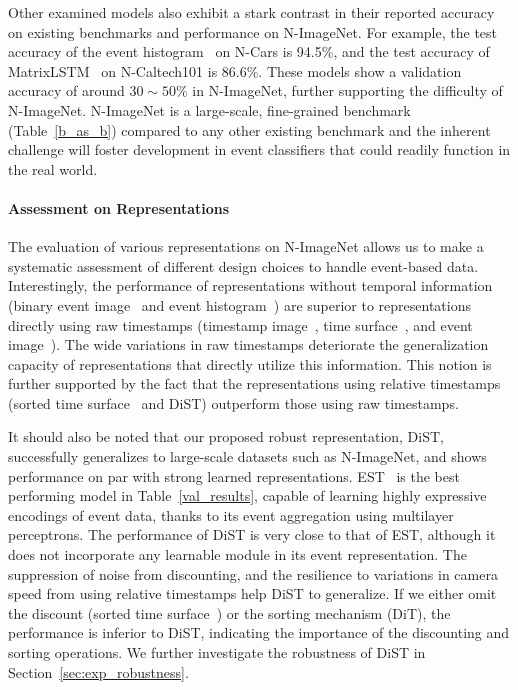 Other examined models also exhibit a stark contrast in their reported accuracy on existing benchmarks and performance on N-ImageNet.
For example, the test accuracy of the event histogram~\cite{asynet} on N-Cars is 94.5\%, and the test accuracy of MatrixLSTM~\cite{matrix_lstm} on N-Caltech101 is 86.6\%.
These models show a validation accuracy of around $30\sim50\%$ in N-ImageNet, further supporting the difficulty of N-ImageNet.
N-ImageNet is a large-scale, fine-grained benchmark (Table~\ref{b_as_b}) compared to any other existing benchmark and the inherent challenge will foster development in event classifiers that could readily function in the real world.

\paragraph{Assessment on Representations}
The evaluation of various representations on N-ImageNet allows us to make a systematic assessment of different design choices to handle event-based data.
Interestingly, the performance of representations without temporal information (binary event image~\cite{gesture_1,binary_image_2} and event histogram~\cite{event_driving}) are superior to representations directly using raw timestamps (timestamp image~\cite{timestamp_image}, time surface~\cite{hots}, and event image~\cite{ev_gait,evflownet}).
The wide variations in raw timestamps deteriorate the generalization capacity of representations that directly utilize this information.
This notion is further supported by the fact that the representations using relative timestamps (sorted time surface~\cite{ace} and DiST) outperform those using raw timestamps.

It should also be noted that our proposed robust representation, DiST, successfully generalizes to large-scale datasets such as N-ImageNet, and shows performance on par with strong learned representations.
EST~\cite{est} is the best performing model in Table~\ref{val_results}, capable of learning highly expressive encodings of event data, thanks to its event aggregation using multilayer perceptrons.
The performance of DiST is very close to that of EST, although it does not incorporate any learnable module in its event representation.
The suppression of noise from discounting, and the resilience to variations in camera speed from using relative timestamps help DiST to generalize.
If we either omit the discount (sorted time surface~\cite{ace}) or the sorting mechanism (DiT), the performance is inferior to DiST, indicating the importance of the discounting and sorting operations.
We further investigate the robustness of DiST in Section~\ref{sec:exp_robustness}.


